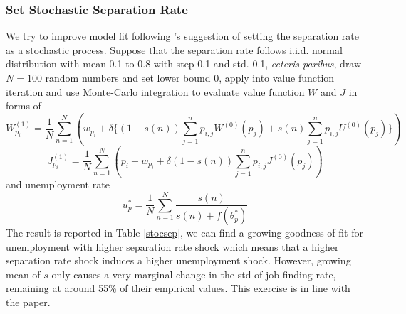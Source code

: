 \documentclass[10pt]{article} %
\begin{document}
    \subsubsection{Set Stochastic Separation Rate}
    We try to improve model fit following \cite{Shimer2005}'s suggestion of setting the separation rate as a stochastic process. 
    Suppose that the separation rate follows i.i.d. normal distribution with mean 0.1 to 0.8 with step 0.1 and std. 0.1, \textit{ceteris paribus}, draw $N=100$ random numbers and set lower bound 0, apply into value function iteration and use Monte-Carlo integration to evaluate value function $W$ and $J$ in forms of 
    \[W^{(1)}_{p_i} =\frac{1}{N}\sum\limits_{n=1}^{N}(w_{p_i} + \delta\{(1-s(n))\sum_{j=1}^{n}p_{i,j}W^{(0)}(p_j) + s(n)\sum_{j=1}^{n}p_{i,j}U^{(0)}(p_j)\})\]
    \[J^{(1)}_{p_i} = \frac{1}{N}\sum\limits_{n=1}^{N}(p_i - w_{p_i} + \delta (1-s(n))\sum_{j=1}^{n}p_{i,j}J^{(0)}(p_j))\]
    and unemployment rate
    \[u^*_p = \frac{1}{N}\sum\limits_{n=1}^{N}\frac{s(n)}{s(n) + f(\theta^*_p)}\]
    The result is reported in Table \ref{stocsep}, we can find a growing goodness-of-fit for unemployment with higher separation rate shock which means that a higher separation rate shock induces a higher unemployment shock. However, growing mean of $s$ only causes a very marginal change in the std of job-finding rate, remaining at around 55\% of their empirical values. This exercise is in line with the paper.\newline
\end{document}
